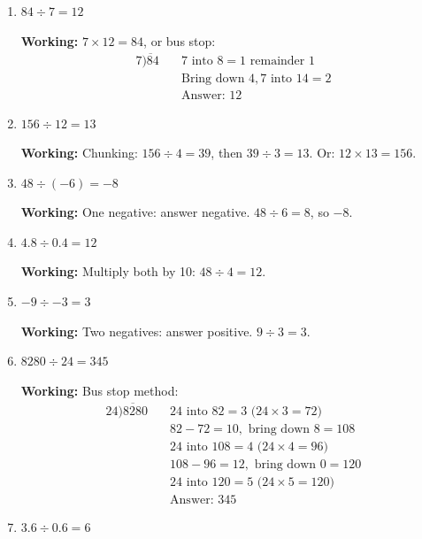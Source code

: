 \documentclass[12pt,a4paper]{article}
\begin{document}
\begin{enumerate}
    \item $84 \div 7 = 12$
    
    \textbf{Working:} $7 \times 12 = 84$, or bus stop:
    \begin{align*}
        7\overline{)84} &\quad 7 \text{ into } 8 = 1 \text{ remainder } 1 \\
        &\quad \text{Bring down } 4, 7 \text{ into } 14 = 2 \\
        &\quad \text{Answer: } 12
    \end{align*}
    
    \item $156 \div 12 = 13$
    
    \textbf{Working:} Chunking: $156 \div 4 = 39$, then $39 \div 3 = 13$.
    Or: $12 \times 13 = 156$.
    
    \item $48 \div (-6) = -8$
    
    \textbf{Working:} One negative: answer negative. $48 \div 6 = 8$, so $-8$.
    
    \item $4.8 \div 0.4 = 12$
    
    \textbf{Working:} Multiply both by 10: $48 \div 4 = 12$.
    
    \item $-9 \div -3 = 3$
    
    \textbf{Working:} Two negatives: answer positive. $9 \div 3 = 3$.
    
    \item $8280 \div 24 = 345$
    
    \textbf{Working:} Bus stop method:
    \begin{align*}
        24\overline{)8280} &\quad 24 \text{ into } 82 = 3 \text{ (}24\times3=72\text{)} \\
        &\quad 82-72=10, \text{ bring down } 8 = 108 \\
        &\quad 24 \text{ into } 108 = 4 \text{ (}24\times4=96\text{)} \\
        &\quad 108-96=12, \text{ bring down } 0 = 120 \\
        &\quad 24 \text{ into } 120 = 5 \text{ (}24\times5=120\text{)} \\
        &\quad \text{Answer: } 345
    \end{align*}
    
    \item $3.6 \div 0.6 = 6$
    

\end{enumerate}
\end{document}
